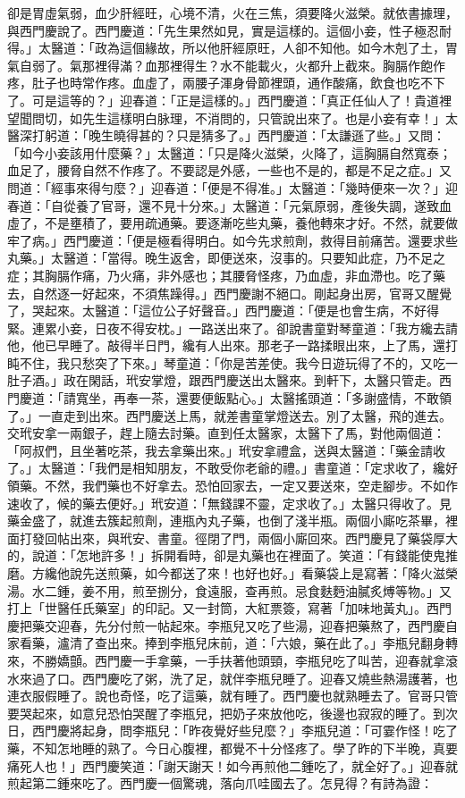 \begin{showcontents}{}
卻是胃虛氣弱，血少肝經旺，心境不清，火在三焦，須要降火滋榮。就依書據理，與西門慶說了。西門慶道：「先生果然如見，實是這樣的。這個小妾，性子極忍耐得。」太醫道：「政為這個緣故，所以他肝經原旺，人卻不知他。如今木剋了土，胃氣自弱了。氣那裡得滿？血那裡得生？水不能載火，火都升上截來。胸膈作飽作疼，肚子也時常作疼。血虛了，兩腰子渾身骨節裡頭，通作酸痛，飲食也吃不下了。可是這等的？」迎春道：「正是這樣的。」西門慶道：「真正任仙人了！貴道裡望聞問切，如先生這樣明白脉理，不消問的，只管說出來了。也是小妾有幸！」太醫深打躬道：「晚生曉得甚的？只是猜多了。」西門慶道：「太謙遜了些。」又問：「如今小妾該用什麼藥？」太醫道：「只是降火滋榮，火降了，這胸膈自然寬泰；血足了，腰脅自然不作疼了。不要認是外感，一些也不是的，都是不足之症。」又問道：「經事來得勻麼？」迎春道：「便是不得准。」太醫道：「幾時便來一次？」迎春道：「自從養了官哥，還不見十分來。」太醫道：「元氣原弱，產後失調，遂致血虛了，不是壅積了，要用疏通藥。要逐漸吃些丸藥，養他轉來才好。不然，就要做牢了病。」西門慶道：「便是極看得明白。如今先求煎劑，救得目前痛苦。還要求些丸藥。」太醫道：「當得。晚生返舍，即便送來，沒事的。只要知此症，乃不足之症；其胸膈作痛，乃火痛，非外感也；其腰脅怪疼，乃血虛，非血滯也。吃了藥去，自然逐一好起來，不須焦躁得。」西門慶謝不絕口。剛起身出房，官哥又醒覺了，哭起來。太醫道：「這位公子好聲音。」西門慶道：「便是也會生病，不好得緊。連累小妾，日夜不得安枕。」一路送出來了。卻說書童對琴童道：「我方纔去請他，他已早睡了。敲得半日門，纔有人出來。那老子一路揉眼出來，上了馬，還打盹不住，我只愁突了下來。」琴童道：「你是苦差使。我今日遊玩得了不的，又吃一肚子酒。」政在閑話，玳安掌燈，跟西門慶送出太醫來。到軒下，太醫只管走。西門慶道：「請寬坐，再奉一茶，還要便飯點心。」太醫搖頭道：「多謝盛情，不敢領了。」一直走到出來。西門慶送上馬，就差書童掌燈送去。別了太醫，飛的進去。交玳安拿一兩銀子，趕上隨去討藥。直到任太醫家，太醫下了馬，對他兩個道：「阿叔們，且坐著吃茶，我去拿藥出來。」玳安拿禮盒，送與太醫道：「藥金請收了。」太醫道：「我們是相知朋友，不敢受你老爺的禮。」書童道：「定求收了，纔好領藥。不然，我們藥也不好拿去。恐怕回家去，一定又要送來，空走腳步。不如作速收了，候的藥去便好。」玳安道：「無錢課不靈，定求收了。」太醫只得收了。見藥金盛了，就進去簇起煎劑，連瓶內丸子藥，也倒了淺半瓶。兩個小廝吃茶畢，裡面打發回帖出來，與玳安、書童。徑閉了門，兩個小廝回來。西門慶見了藥袋厚大的，說道：「怎地許多！」拆開看時，卻是丸藥也在裡面了。笑道：「有錢能使鬼推磨。方纔他說先送煎藥，如今都送了來！也好也好。」看藥袋上是寫著：「降火滋榮湯。水二鍾，姜不用，煎至捌分，食遠服，查再煎。忌食麩麪油膩炙煿等物。」又打上「世醫任氏藥室」的印記。又一封筒，大紅票簽，寫著「加味地黃丸」。西門慶把藥交迎春，先分付煎一帖起來。李瓶兒又吃了些湯，迎春把藥熬了，西門慶自家看藥，瀘清了查出來。捧到李瓶兒床前，道：「六娘，藥在此了。」李瓶兒翻身轉來，不勝嬌顫。西門慶一手拿藥，一手扶著他頭頸，李瓶兒吃了叫苦，迎春就拿滾水來過了口。西門慶吃了粥，洗了足，就伴李瓶兒睡了。迎春又燒些熱湯護著，也連衣服假睡了。說也奇怪，吃了這藥，就有睡了。西門慶也就熟睡去了。官哥只管要哭起來，如意兒恐怕哭醒了李瓶兒，把奶子來放他吃，後邊也寂寂的睡了。到次日，西門慶將起身，問李瓶兒：「昨夜覺好些兒麼？」李瓶兒道：「可霎作怪！吃了藥，不知怎地睡的熟了。今日心腹裡，都覺不十分怪疼了。學了昨的下半晚，真要痛死人也！」西門慶笑道：「謝天謝天！如今再煎他二鍾吃了，就全好了。」迎春就煎起第二鍾來吃了。西門慶一個驚魂，落向爪哇國去了。怎見得？有詩為證：


\end{showcontents}
